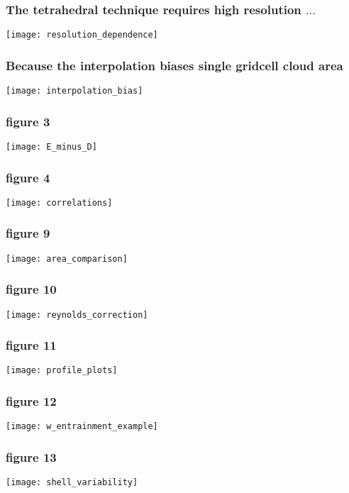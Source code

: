 \documentclass[fleqn,hyperref={colorlinks=true,linkcolor=blue,urlcolor=blue},numbers]{beamer}
\begin{document}
\begin{frame}
\frametitle{The tetrahedral technique requires high resolution $\ldots$}
\texttt{[image: resolution\_dependence]}
\end{frame}


\begin{frame}
\frametitle{Because the interpolation biases single gridcell cloud area}
\texttt{[image: interpolation\_bias]}
\end{frame}


\begin{frame}
\frametitle{figure 3}
\texttt{[image: E\_minus\_D]}
\end{frame}


\begin{frame}
\frametitle{figure 4}
\texttt{[image: correlations]}
\end{frame}






\begin{frame}
\frametitle{figure 9}
\texttt{[image: area\_comparison]}
\end{frame}

\begin{frame}
\frametitle{figure 10}
\texttt{[image: reynolds\_correction]}
\end{frame}


\begin{frame}
\frametitle{figure 11}
\texttt{[image: profile\_plots]}
\end{frame}


\begin{frame}
\frametitle{figure 12}
\texttt{[image: w\_entrainment\_example]}
\end{frame}


\begin{frame}
\frametitle{figure 13}
\texttt{[image: shell\_variability]}
\end{frame}


 
\end{document}
